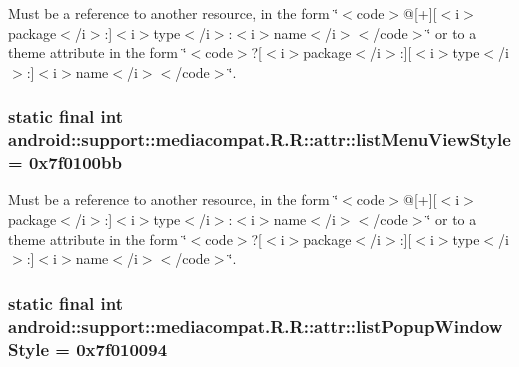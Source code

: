 Must be a reference to another resource, in the form \char`\"{}$<$code$>$@\mbox{[}+\mbox{]}\mbox{[}$<$i$>$package$<$/i$>$:\mbox{]}$<$i$>$type$<$/i$>$:$<$i$>$name$<$/i$>$$<$/code$>$\char`\"{} or to a theme attribute in the form \char`\"{}$<$code$>$?\mbox{[}$<$i$>$package$<$/i$>$:\mbox{]}\mbox{[}$<$i$>$type$<$/i$>$:\mbox{]}$<$i$>$name$<$/i$>$$<$/code$>$\char`\"{}. \hypertarget{classandroid_1_1support_1_1mediacompat_1_1_r_1_1attr_f4033cb0696a2d2fcf09168142dbdf19}{
\subsubsection[{listMenuViewStyle}]{\setlength{\rightskip}{0pt plus 5cm}static final int android::support::mediacompat.R.R::attr::listMenuViewStyle = 0x7f0100bb}}
\label{classandroid_1_1support_1_1mediacompat_1_1_r_1_1attr_f4033cb0696a2d2fcf09168142dbdf19}


Must be a reference to another resource, in the form \char`\"{}$<$code$>$@\mbox{[}+\mbox{]}\mbox{[}$<$i$>$package$<$/i$>$:\mbox{]}$<$i$>$type$<$/i$>$:$<$i$>$name$<$/i$>$$<$/code$>$\char`\"{} or to a theme attribute in the form \char`\"{}$<$code$>$?\mbox{[}$<$i$>$package$<$/i$>$:\mbox{]}\mbox{[}$<$i$>$type$<$/i$>$:\mbox{]}$<$i$>$name$<$/i$>$$<$/code$>$\char`\"{}. \hypertarget{classandroid_1_1support_1_1mediacompat_1_1_r_1_1attr_9409b80e97559eb89ba6a5f9c47073dd}{
\subsubsection[{listPopupWindowStyle}]{\setlength{\rightskip}{0pt plus 5cm}static final int android::support::mediacompat.R.R::attr::listPopupWindowStyle = 0x7f010094}}
\label{classandroid_1_1support_1_1mediacompat_1_1_r_1_1attr_9409b80e97559eb89ba6a5f9c47073dd}


